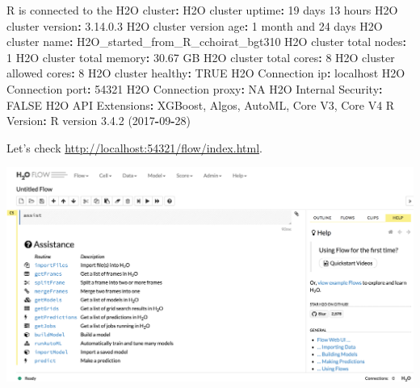 \documentclass[]{book}
\newenvironment{Shaded}{\begin{snugshade}}{\end{snugshade}}
\newcommand{\DecValTok}[1]{\textcolor[rgb]{0.00,0.00,0.81}{#1}}
\newcommand{\FloatTok}[1]{\textcolor[rgb]{0.00,0.00,0.81}{#1}}
\newcommand{\StringTok}[1]{\textcolor[rgb]{0.31,0.60,0.02}{#1}}
\newcommand{\OtherTok}[1]{\textcolor[rgb]{0.56,0.35,0.01}{#1}}
\newcommand{\OperatorTok}[1]{\textcolor[rgb]{0.81,0.36,0.00}{\textbf{#1}}}
\newcommand{\NormalTok}[1]{#1}
\theoremstyle{definition}
\theoremstyle{definition}
\theoremstyle{definition}
\theoremstyle{remark}
\begin{document}
\begin{Shaded}
\begin{Highlighting}[]
\NormalTok{R is connected to the H2O cluster}\OperatorTok{:}\StringTok{ }
\StringTok{    }\NormalTok{H2O cluster uptime}\OperatorTok{:}\StringTok{         }\DecValTok{19}\NormalTok{ days }\DecValTok{13}\NormalTok{ hours }
\NormalTok{    H2O cluster version}\OperatorTok{:}\StringTok{        }\FloatTok{3.14}\NormalTok{.}\FloatTok{0.3} 
\NormalTok{    H2O cluster version age}\OperatorTok{:}\StringTok{    }\DecValTok{1}\NormalTok{ month and }\DecValTok{24}\NormalTok{ days  }
\NormalTok{    H2O cluster name}\OperatorTok{:}\StringTok{           }\NormalTok{H2O_started_from_R_cchoirat_bgt310 }
\NormalTok{    H2O cluster total nodes}\OperatorTok{:}\StringTok{    }\DecValTok{1} 
\NormalTok{    H2O cluster total memory}\OperatorTok{:}\StringTok{   }\FloatTok{30.67}\NormalTok{ GB}
\NormalTok{    H2O cluster total cores}\OperatorTok{:}\StringTok{    }\DecValTok{8} 
\NormalTok{    H2O cluster allowed cores}\OperatorTok{:}\StringTok{  }\DecValTok{8} 
\NormalTok{    H2O cluster healthy}\OperatorTok{:}\StringTok{        }\OtherTok{TRUE} 
\NormalTok{    H2O Connection ip}\OperatorTok{:}\StringTok{          }\NormalTok{localhost }
\NormalTok{    H2O Connection port}\OperatorTok{:}\StringTok{        }\DecValTok{54321} 
\NormalTok{    H2O Connection proxy}\OperatorTok{:}\StringTok{       }\OtherTok{NA} 
\NormalTok{    H2O Internal Security}\OperatorTok{:}\StringTok{      }\OtherTok{FALSE} 
\NormalTok{    H2O API Extensions}\OperatorTok{:}\StringTok{         }\NormalTok{XGBoost, Algos, AutoML, Core V3, Core V4 }
\NormalTok{    R Version}\OperatorTok{:}\StringTok{                  }\NormalTok{R version }\FloatTok{3.4}\NormalTok{.}\DecValTok{2}\NormalTok{ (}\DecValTok{2017}\OperatorTok{-}\DecValTok{09}\OperatorTok{-}\DecValTok{28}\NormalTok{) }
\end{Highlighting}
\end{Shaded}

Let's check \url{http://localhost:54321/flow/index.html}.

\begin{center}\includegraphics[width=39.08in]{images/ch6_h2o_flow} \end{center}
\end{document}
